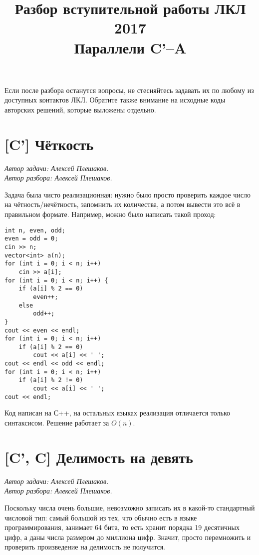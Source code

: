 \documentclass[12pt]{article}
\theoremstyle{definition}
\begin{document}
\title{Разбор вступительной работы ЛКЛ 2017\\Параллели C'--A}
\date{}

\renewcommand{\thesection}{\Alph{section}.}
\maketitle
Если после разбора останутся вопросы, не стесняйтесь задавать их по любому из доступных контактов ЛКЛ. Обратите также внимание на исходные коды авторских решений,
которые выложены отдельно.

\tableofcontents


\section{[C'] Чёткость}
\textit{Автор задачи: Алексей Плешаков.} \\
\textit{Автор разбора: Алексей Плешаков.}

Задача была чисто реализационная: нужно было просто проверить каждое число на чётность/нечётность, запомнить их количества, а потом вывести это всё в правильном формате. Например, можно было написать такой проход:
\begin{verbatim}
int n, even, odd;
even = odd = 0;
cin >> n;
vector<int> a(n);
for (int i = 0; i < n; i++)
    cin >> a[i];
for (int i = 0; i < n; i++) {
    if (a[i] % 2 == 0)
        even++;
    else
        odd++;
}
cout << even << endl; 
for (int i = 0; i < n; i++)
    if (a[i] % 2 == 0)
        cout << a[i] << ' ';
cout << endl << odd << endl;
for (int i = 0; i < n; i++)
    if (a[i] % 2 != 0)
        cout << a[i] << ' ';
cout << endl;
\end{verbatim}

Код написан на С++, на остальных языках реализация отличается только синтаксисом.
Решение работает за $O(n)$.

\pagebreak

\section{[C', C] Делимость на девять}
\textit{Автор задачи: Алексей Плешаков.} \\
\textit{Автор разбора: Алексей Плешаков.}

Поскольку числа очень большие, невозможно записать их в какой-то стандартный числовой тип: самый большой из тех,
что обычно есть в языке программирования, занимает 64 бита, то есть хранит порядка 19 десятичных цифр, а даны числа размером до миллиона цифр. Значит, просто перемножить и проверить произведение на делимость не получится.
\end{document}
